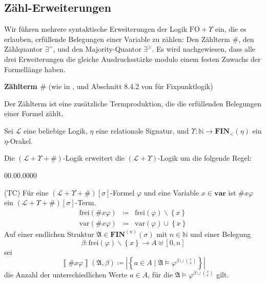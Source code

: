 \subsection{Zähl-Erweiterungen}

Wir führen mehrere syntaktische Erweiterungen der Logik $\mathrm{FO}+\Upsilon$
ein, die es erlauben, erfüllende Belegungen einer Variable zu zählen:
Den Zählterm $\#$, den Zählquantor $\exists^{=}$, und den Majority-Quantor
$\exists^{\geqslant}$. Es wird nachgewiesen, dass alle drei Erweiterungen
die gleiche Ausdrucksstärke modulo einem festen Zuwachs der Formellänge
haben.
\begin{defn}
\textbf{Zählterm $\#$} (wie in \cite{AD2014}, und Abschnitt 8.4.2
von \cite{EbbinghausFlum} für Fixpunktlogik)

Der Zählterm ist eine zusätzliche Termproduktion, die die erfüllenden
Belegungen einer Formel zählt.

Sei $\mathcal{L}$ eine beliebige Logik, $\eta$ eine relationale
Signatur, und $\Upsilon:\mathbb{N}\rightarrow\mathbf{FIN}_{<}\left(\eta\right)$
ein $\eta$-Orakel.

Die $\left(\mathcal{L}+\Upsilon+\#\right)$-Logik erweitert die $\left(\mathcal{L}+\Upsilon\right)$-Logik
um die folgende Regel:

\begin{labeling}{00.00.0000}
\item [{(TC)}] Für eine $\left(\mathcal{L}+\Upsilon+\#\right)\left[\sigma\right]$-Formel
$\varphi$ und eine Variable $x\in\mathbf{var}$ ist $\#x\varphi$
ein $\left(\mathcal{L}+\Upsilon+\#\right)\left[\sigma\right]$-Term.
\begin{eqnarray*}
\mathrm{frei}\left(\#x\varphi\right) & \coloneqq & \mathrm{frei}\left(\varphi\right)\backslash\left\{ x\right\} \\
\mathrm{var}\left(\#x\varphi\right) & \coloneqq & \mathrm{var}\left(\varphi\right)\cup\left\{ x\right\} 
\end{eqnarray*}
Auf einer endlichen Struktur $\mathfrak{A}\in\mathbf{FIN}^{\left(n\right)}\left(\sigma\right)$
mit $n\in\mathbb{N}$ und einer Belegung 
\[
\beta:\mathrm{frei}\left(\varphi\right)\backslash\left\{ x\right\} \rightarrow A\uplus\left[0,n\right]
\]
 sei 
\[
\left\llbracket \#x\varphi\right\rrbracket \left(\mathfrak{A},\beta\right)\coloneqq\left|\left\{ a\in A\mid\mathfrak{A}\models\varphi^{\beta\cup\binom{x}{a}}\right\} \right|
\]
die Anzahl der unterschiedlichen Werte $a\in A$, für die $\mathfrak{A}\models\varphi^{\beta\cup\binom{x}{a}}$
gilt.
\end{labeling}
\end{defn}
